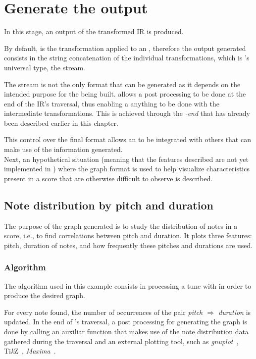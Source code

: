 \section{Generate the output}

In this stage, an output of the transformed \ac{IR} is produced.

By default, \toabc{} is the transformation applied to an \abcelement{}, therefore the output
generated consists in the string concatenation of the individual transformations, which is
\abcdt{}'s universal type, the \abc{} stream.

The \abc{} stream is not the only format that can be generated as it depends on the intended purpose
for the \abcpt{} being built. \abcdt{} allows a post processing to be done at the end of the
\ac{IR}'s traversal, thus enabling a anything to be done with the intermediate transformations. This
is achieved through the \actuator{} \emph{-end} that has already been described earlier in this
chapter.

This control over the final format allows an \abcpt{} to be integrated with others that can make use
of the information generated.\\

Next, an hypothetical situation (meaning that the features described are not yet implemented in
\abcdt{}) where the graph format is used to help visualize characteristics present in a score that
are otherwise difficult to observe is described.

\subsection*{Note distribution by pitch and duration}

The purpose of the graph generated is to study the distribution of notes in a score, i.e., to find
correlations between pitch and duration. It plots three features: pitch, duration of notes, and how
frequently these pitches and durations are used.

\subsubsection*{Algorithm}

The algorithm used in this example consists in processing a tune with \dt{} in order to produce the
desired graph.

For every note found, the number of occurrences of the pair \emph{pitch $\Rightarrow$ duration} is
updated. In the end of \dt{}'s traversal, a post processing for generating the graph is done by
calling an auxiliar function that makes use of the note distribution data gathered during the
traversal and an external plotting tool, such as \emph{gnuplot}~\cite{gnuplot:Online},
Ti\emph{k}Z~\cite{tikz:Online}, \emph{Maxima}~\cite{maxima:Online}.

